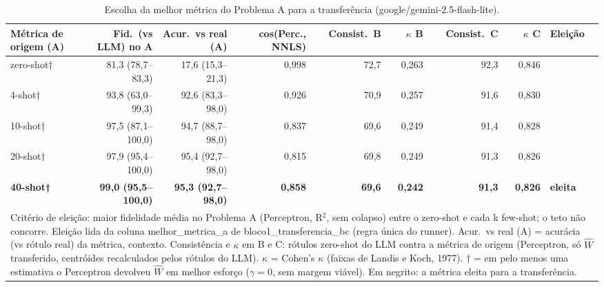 \begin{table}[htbp]
\centering
\small
\caption{Escolha da melhor métrica do Problema A para a transferência (google/gemini-2.5-flash-lite).}
\label{tab:T7_escolha_flashlite}
\begin{tabular}{lrrrrrrrl}
\toprule
Métrica de origem (A) & Fid.\ (vs LLM) no A & Acur.\ vs real (A) & cos(Perc., NNLS) & Consist.\ B & $\kappa$ B & Consist.\ C & $\kappa$ C & Eleição \\
\midrule
zero-shot† & 81,3 (78,7–83,3) & 17,6 (15,3–21,3) & 0,998 & 72,7 & 0,263 & 92,3 & 0,846 &  \\
4-shot† & 93,8 (63,0–99,3) & 92,6 (83,3–98,0) & 0,926 & 70,9 & 0,257 & 91,6 & 0,830 &  \\
10-shot† & 97,5 (87,1–100,0) & 94,7 (88,7–98,0) & 0,837 & 69,6 & 0,249 & 91,4 & 0,828 &  \\
20-shot† & 97,9 (95,4–100,0) & 95,4 (92,7–98,0) & 0,815 & 69,8 & 0,249 & 91,3 & 0,826 &  \\
\textbf{40-shot†} & \textbf{99,0 (95,5–100,0)} & \textbf{95,3 (92,7–98,0)} & \textbf{0,858} & \textbf{69,6} & \textbf{0,242} & \textbf{91,3} & \textbf{0,826} & \textbf{eleita} \\
\bottomrule
\multicolumn{9}{p{0.95\linewidth}}{\footnotesize Critério de eleição: maior fidelidade média no Problema A (Perceptron, R$^2$, sem colapso) entre o zero-shot e cada k few-shot; o teto não concorre. Eleição lida da coluna melhor\_metrica\_a de bloco1\_transferencia\_bc (regra única do runner). Acur.\ vs real (A) = acurácia (vs rótulo real) da métrica, contexto. Consistência e $\kappa$ em B e C: rótulos zero-shot do LLM contra a métrica de origem (Perceptron, só $\hat{W}$ transferido, centróides recalculados pelos rótulos do LLM). $\kappa$ = Cohen's $\kappa$ (faixas de Landis e Koch, 1977). † = em pelo menos uma estimativa o Perceptron devolveu $\hat{W}$ em melhor esforço ($\gamma = 0$, sem margem viável). Em negrito: a métrica eleita para a transferência.} \\
\end{tabular}
\end{table}
